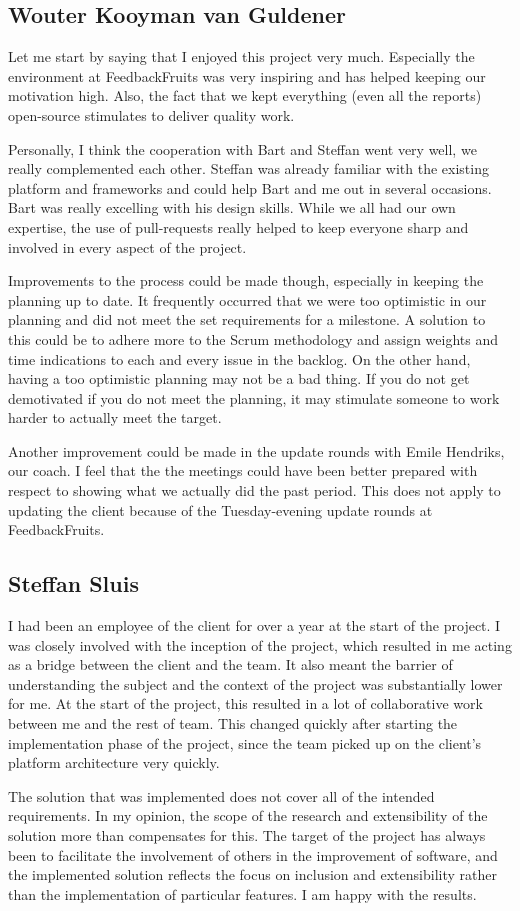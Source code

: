 \subsection{Wouter Kooyman van Guldener}
Let me start by saying that I enjoyed this project very much. Especially the environment at FeedbackFruits was very inspiring and has helped keeping our motivation high. Also, the fact that we kept everything (even all the reports) open-source stimulates to deliver quality work.

Personally, I think the cooperation with Bart and Steffan went very well, we really complemented each other. Steffan was already familiar with the existing platform and frameworks and could help Bart and me out in several occasions. Bart was really excelling with his design skills. While we all had our own expertise, the use of pull-requests really helped to keep everyone sharp and involved in every aspect of the project.

Improvements to the process could be made though, especially in keeping the planning up to date. It frequently occurred that we were too optimistic in our planning and did not meet the set requirements for a milestone. A solution to this could be to adhere more to the Scrum methodology and assign weights and time indications to each and every issue in the backlog. On the other hand, having a too optimistic planning may not be a bad thing. If you do not get demotivated if you do not meet the planning, it may stimulate someone to work harder to actually meet the target.

Another improvement could be made in the update rounds with Emile Hendriks, our coach. I feel that the the meetings could have been better prepared with respect to showing what we actually did the past period. This does not apply to updating the client because of the Tuesday-evening update rounds at FeedbackFruits.

\subsection{Steffan Sluis}
I had been an employee of the client for over a year at the start of the project. I was closely involved with the inception of the project, which resulted in me acting as a bridge between the client and the team. It also meant the barrier of understanding the subject and the context of the project was substantially lower for me. At the start of the project, this resulted in a lot of collaborative work between me and the rest of team. This changed quickly after starting the implementation phase of the project, since the team picked up on the client's platform architecture very quickly.

The solution that was implemented does not cover all of the intended requirements. In my opinion, the scope of the research and extensibility of the solution more than compensates for this. The target of the project has always been to facilitate the involvement of others in the improvement of software, and the implemented solution reflects the focus on inclusion and extensibility rather than the implementation of particular features. I am happy with the results.
